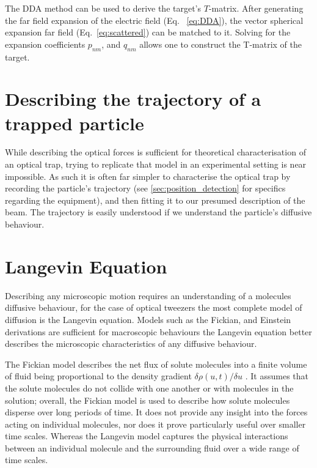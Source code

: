 The DDA method can be used to derive the target's $T$-matrix. After
generating the far field expansion of the electric field (Eq.~
\eqref{eq:DDA}), the vector spherical expansion far field 
(Eq.~\eqref{eq:scattered}) can be matched to it. Solving for the 
expansion coefficients $p_{nm}$, and $q_{nm}$ allows one to construct
the T-matrix of the target. 
\newpage
\section{Describing the trajectory of a trapped particle}
While describing the optical forces is sufficient for 
theoretical characterisation of an optical trap, trying 
to replicate that model in an experimental setting is 
near impossible. As such it is often far simpler to 
characterise the optical trap by recording the particle's
trajectory (see \ref{sec:position_detection} for 
specifics regarding the equipment), and then fitting it 
to our presumed description of the beam. The trajectory 
is easily understood if we understand the particle's 
diffusive behaviour.

\section{Langevin Equation}
Describing any microscopic motion requires an understanding 
of a molecules diffusive behaviour, for the case of optical 
tweezers the most complete model of diffusion is the Langevin 
equation. Models such as the Fickian, and Einstein derivations 
are sufficient for macroscopic behaviours the Langevin 
equation better describes the microscopic characteristics of 
any diffusive behaviour.
 
The Fickian model describes the net flux of solute molecules 
into a finite volume of fluid being proportional to the 
density gradient $\delta\rho(u,t)/\delta u$ \cite{Gillespie2012}. 
It assumes that the solute molecules do not collide with one 
another or with molecules in the solution; overall, the Fickian 
model is used to describe how solute molecules disperse over 
long periods of time. It does not provide any insight into 
the forces acting on individual molecules, nor does it prove 
particularly useful over smaller time scales. Whereas the Langevin 
model captures the physical interactions between an individual 
molecule and the surrounding fluid over a wide range of time 
scales.

